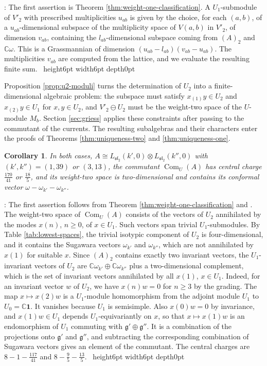 \documentclass[leqno]{article}
\newcommand{\Cbb}{\ensuremath{\mathbb{C}}}
\renewcommand{\geq}{\ensuremath{\geqslant}}
\newcommand{\qed}{\hfill \vrule height6pt  width6pt depth0pt}
\newcommand{\ot}{\otimes}
\newtheorem{cor}[thm]{Corollary}
\newenvironment{proof}[1][]{\noindent {\it Proof #1} : }{\hbox{~}\qed
\smallskip
}
\numberwithin{equation}{section}
\begin{document}
\begin{proof}
The first assertion is Theorem \ref{thm:weight-one-classification}. A $U_1$-submodule of $V'_2$ with prescribed multiplicities $u_{ab}$ is given by the choice, for each $(a,b)$, of a $u_{ab}$-dimensional subspace of the multiplicity space of $V(a,b)$ in $V'_2$, of dimension $v_{ab}$, containing the $l_{ab}$-dimensional subspace coming from $(A)_2$ and $\Cbb\omega$. This is a Grassmannian of dimension $(u_{ab}-l_{ab})(v_{ab}-u_{ab})$. The multiplicities $v_{ab}$ are computed from the lattice, and we evaluate the resulting finite sum.
\end{proof}

Proposition \ref{prop:u2-moduli} turns the determination of $U_2$ into a finite-dimensional algebraic problem: the subspace must satisfy $x_{(1)}y \in U_2$ and $x_{(2)}y \in U_1$ for $x, y \in U_2$, and $V'_2 \ominus U_2$ must be the weight-two space of the $U$-module $M_b$. Section \ref{sec:griess} applies these constraints after passing to the commutant of the currents. The resulting subalgebras and their characters enter the proofs of Theorems \ref{thm:uniqueness-two} and \ref{thm:uniqueness-one}.

\begin{cor}
\label{cor:affine-commutant}
In both cases, $A \cong L_{\mathfrak{sl}_2}(k',0) \ot L_{\mathfrak{sl}_2}(k'',0)$ with $(k',k'') = (1,39)$ or $(3,13)$, the commutant $\operatorname{Com}_U(A)$ has central charge $\frac{170}{41}$ or $\frac{18}{5}$, and its weight-two space is two-dimensional and contains its conformal vector $\omega-\omega_{k'}-\omega_{k''}$.
\end{cor}

\begin{proof}
The first assertion follows from Theorem \ref{thm:weight-one-classification} and \cite[Theorem 3.1 p.~4]{DoM06}. The weight-two space of $\operatorname{Com}_U(A)$ consists of the vectors of $U_2$ annihilated by the modes $x(n)$, $n \geq 0$, of $x \in U_1$. Such vectors span trivial $U_1$-submodules. By Table \ref{tab:lowest-spaces}, the trivial isotypic component of $U_2$ is four-dimensional, and it contains the Sugawara vectors $\omega_{k'}$ and $\omega_{k''}$, which are not annihilated by $x(1)$ for suitable $x$. Since $(A)_2$ contains exactly two invariant vectors, the $U_1$-invariant vectors of $U_2$ are $\Cbb\omega_{k'} \oplus \Cbb\omega_{k''}$ plus a two-dimensional complement, which is the set of invariant vectors annihilated by all $x(1)$, $x \in U_1$. Indeed, for an invariant vector $w$ of $U_2$, we have $x(n)w = 0$ for $n \geq 3$ by the grading. The map $x \mapsto x(2)w$ is a $U_1$-module homomorphism from the adjoint module $U_1$ to $U_0 = \Cbb\mathbf 1$. It vanishes because $U_1$ is semisimple. Also $x(0)w = 0$ by invariance, and $x(1)w \in U_1$ depends $U_1$-equivariantly on $x$, so that $x \mapsto x(1)w$ is an endomorphism of $U_1$ commuting with $\mathfrak g' \oplus \mathfrak g''$. It is a combination of the projections onto $\mathfrak g'$ and $\mathfrak g''$, and subtracting the corresponding combination of Sugawara vectors gives an element of the commutant. The central charges are $8-1-\frac{117}{41}$ and $8-\frac95-\frac{13}{5}$.
\end{proof}
\end{document}
